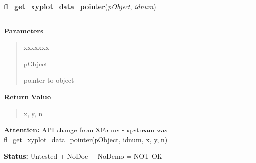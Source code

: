 \hspace{.8\funcindent}\begin{boxedminipage}{\funcwidth}

    \raggedright \textbf{fl\_get\_xyplot\_data\_pointer}(\textit{pObject}, \textit{idnum})

    \vspace{-1.5ex}

    \rule{\textwidth}{0.5\fboxrule}
\setlength{\parskip}{2ex}
\setlength{\parskip}{1ex}
      \textbf{Parameters}
      \vspace{-1ex}

      \begin{quote}
        \begin{Ventry}{xxxxxxx}

          \item[pObject]

          pointer to object

        \end{Ventry}

      \end{quote}

      \textbf{Return Value}
    \vspace{-1ex}

      \begin{quote}
      x, y, n

      \end{quote}

\textbf{Attention:} API change from XForms - upstream was 
fl\_get\_xyplot\_data\_pointer(pObject, idnum, x, y, n)



\textbf{Status:} Untested + NoDoc + NoDemo = NOT OK



    \end{boxedminipage}

    \label{xformslib:library:fl_get_xyplot_overlay_data}

    \vspace{0.5ex}

